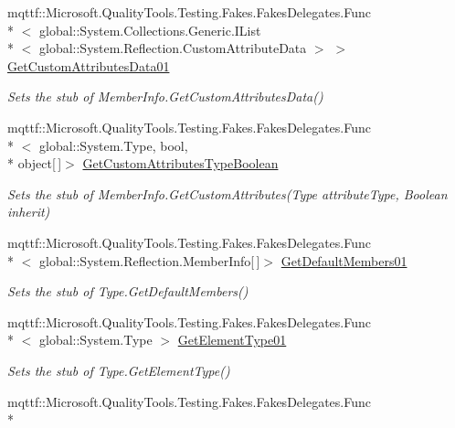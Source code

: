 \begin{DoxyCompactItemize}
mqttf\-::\-Microsoft.\-Quality\-Tools.\-Testing.\-Fakes.\-Fakes\-Delegates.\-Func\\*
$<$ global\-::\-System.\-Collections.\-Generic.\-I\-List\\*
$<$ global\-::\-System.\-Reflection.\-Custom\-Attribute\-Data $>$ $>$ \hyperlink{class_system_1_1_fakes_1_1_stub_type_a55c3badc596b20057bbe026e1e477a67}{Get\-Custom\-Attributes\-Data01}
\begin{DoxyCompactList}\small\item\em Sets the stub of Member\-Info.\-Get\-Custom\-Attributes\-Data()\end{DoxyCompactList}\item 
mqttf\-::\-Microsoft.\-Quality\-Tools.\-Testing.\-Fakes.\-Fakes\-Delegates.\-Func\\*
$<$ global\-::\-System.\-Type, bool, \\*
object\mbox{[}$\,$\mbox{]}$>$ \hyperlink{class_system_1_1_fakes_1_1_stub_type_a42dfffe1099bae685120d9e130f91e0b}{Get\-Custom\-Attributes\-Type\-Boolean}
\begin{DoxyCompactList}\small\item\em Sets the stub of Member\-Info.\-Get\-Custom\-Attributes(\-Type attribute\-Type, Boolean inherit)\end{DoxyCompactList}\item 
mqttf\-::\-Microsoft.\-Quality\-Tools.\-Testing.\-Fakes.\-Fakes\-Delegates.\-Func\\*
$<$ global\-::\-System.\-Reflection.\-Member\-Info\mbox{[}$\,$\mbox{]}$>$ \hyperlink{class_system_1_1_fakes_1_1_stub_type_a6e409b040acdef41dd1660b140cb5c05}{Get\-Default\-Members01}
\begin{DoxyCompactList}\small\item\em Sets the stub of Type.\-Get\-Default\-Members()\end{DoxyCompactList}\item 
mqttf\-::\-Microsoft.\-Quality\-Tools.\-Testing.\-Fakes.\-Fakes\-Delegates.\-Func\\*
$<$ global\-::\-System.\-Type $>$ \hyperlink{class_system_1_1_fakes_1_1_stub_type_a695ca47eb6937f8e4491de98d2525843}{Get\-Element\-Type01}
\begin{DoxyCompactList}\small\item\em Sets the stub of Type.\-Get\-Element\-Type()\end{DoxyCompactList}\item 
mqttf\-::\-Microsoft.\-Quality\-Tools.\-Testing.\-Fakes.\-Fakes\-Delegates.\-Func\\*

\end{DoxyCompactItemize}
